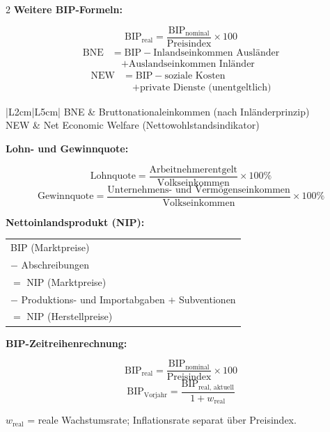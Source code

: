 \documentclass[10pt,a4paper]{article}
\begin{document}
\begin{multicols}{2}
\textbf{Weitere BIP-Formeln:}
\begin{vwlbox}
\[
\text{BIP}_{\text{real}} = \frac{\text{BIP}_{\text{nominal}}}{\text{Preisindex}} \times 100
\]
\begin{align*}
\text{BNE} &= \text{BIP} - \text{Inlandseinkommen Ausländer}\\
           &\quad + \text{Auslandseinkommen Inländer}
\end{align*}
\begin{align*}
\text{NEW} &= \text{BIP} - \text{soziale Kosten}\\
           &\quad + \text{private Dienste (unentgeltlich)}
\end{align*}
\end{vwlbox}

\begin{tabular}{|L{2cm}|L{5cm}|}
\hline
{}
BNE & Bruttonationaleinkommen (nach Inländerprinzip) \\
NEW & Net Economic Welfare (Nettowohlstandsindikator) \\
\hline
\end{tabular}

\vspace{4pt}
\textbf{Lohn- und Gewinnquote:}
\begin{vwlbox}
\[
\text{Lohnquote} = \frac{\text{Arbeitnehmerentgelt}}{\text{Volkseinkommen}} \times 100\%
\]
\[
\text{Gewinnquote} = \frac{\text{Unternehmens- und Vermögenseinkommen}}{\text{Volkseinkommen}} \times 100\%
\]
\end{vwlbox}

\textbf{Nettoinlandsprodukt (NIP):}
\begin{vwlbox}
\renewcommand{\arraystretch}{1.1}
\begin{tabular}{@{}l@{}}
BIP (Marktpreise) \\
$-$ Abschreibungen \\
\hline
$=$ NIP (Marktpreise) \\
$-$ Produktions- und Importabgaben $+$ Subventionen \\
\hline
$=$ NIP (Herstellpreise) \\
\end{tabular}
\end{vwlbox}

\textbf{BIP-Zeitreihenrechnung:}
\begin{vwlbox}
\[
\text{BIP}_{\text{real}} = \frac{\text{BIP}_{\text{nominal}}}{\text{Preisindex}} \times 100
\]
\[
\text{BIP}_{\text{Vorjahr}} = \frac{\text{BIP}_{\text{real, aktuell}}}{1 + w_{\text{real}}}
\]
\end{vwlbox}
{\footnotesize $w_{\text{real}}$ = reale Wachstumsrate; Inflationsrate separat über Preisindex.}

\end{multicols}
\end{document}
